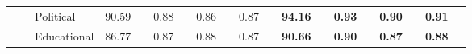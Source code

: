 \begin{table}[!tbh]
{\begin{tabular}{l|l|l|llllllll||llllllll}
                                                                                               &                                  & Political                & \multicolumn{1}{l|}{90.59} & \multicolumn{1}{l|}{}                        & \multicolumn{1}{l|}{0.88} & \multicolumn{1}{l|}{}                       & \multicolumn{1}{l|}{0.86} & \multicolumn{1}{l|}{}                       & \multicolumn{1}{l|}{0.87} &                        & \multicolumn{1}{l|}{\cellcolor[HTML]{FFFE65}\textbf{94.16}} & \multicolumn{1}{l|}{\cellcolor[HTML]{FFFE65}}                                 & \multicolumn{1}{l|}{\cellcolor[HTML]{FFFE65}\textbf{0.93}} & \multicolumn{1}{l|}{\cellcolor[HTML]{FFFE65}}                                & \multicolumn{1}{l|}{\cellcolor[HTML]{FFFE65}\textbf{0.90}} & \multicolumn{1}{l|}{\cellcolor[HTML]{FFFE65}}                                & \multicolumn{1}{l|}{\cellcolor[HTML]{FFFE65}\textbf{0.91}} & \cellcolor[HTML]{FFFE65}                                \\ \cline{3-4} \cline{6-6} \cline{8-8} \cline{10-10} \cline{12-12} \cline{14-14} \cline{16-16} \cline{18-18}
                                                                                               &                                  & Educational              & \multicolumn{1}{l|}{86.77} & \multicolumn{1}{l|}{}                        & \multicolumn{1}{l|}{0.87} & \multicolumn{1}{l|}{}                       & \multicolumn{1}{l|}{0.88} & \multicolumn{1}{l|}{}                       & \multicolumn{1}{l|}{0.87} &                        & \multicolumn{1}{l|}{\cellcolor[HTML]{FFFE65}\textbf{90.66}} & \multicolumn{1}{l|}{\cellcolor[HTML]{FFFE65}}                                 & \multicolumn{1}{l|}{\cellcolor[HTML]{FFFE65}\textbf{0.90}} & \multicolumn{1}{l|}{\cellcolor[HTML]{FFFE65}}                                & \multicolumn{1}{l|}{\cellcolor[HTML]{FFFE65}\textbf{0.87}} & \multicolumn{1}{l|}{\cellcolor[HTML]{FFFE65}}                                & \multicolumn{1}{l|}{\cellcolor[HTML]{FFFE65}\textbf{0.88}} & \cellcolor[HTML]{FFFE65}                                \\ \cline{3-4} \cline{6-6} \cline{8-8} \cline{10-10} \cline{12-12} \cline{14-14} \cline{16-16} \cline{18-18}

\end{tabular}}
\end{table}
